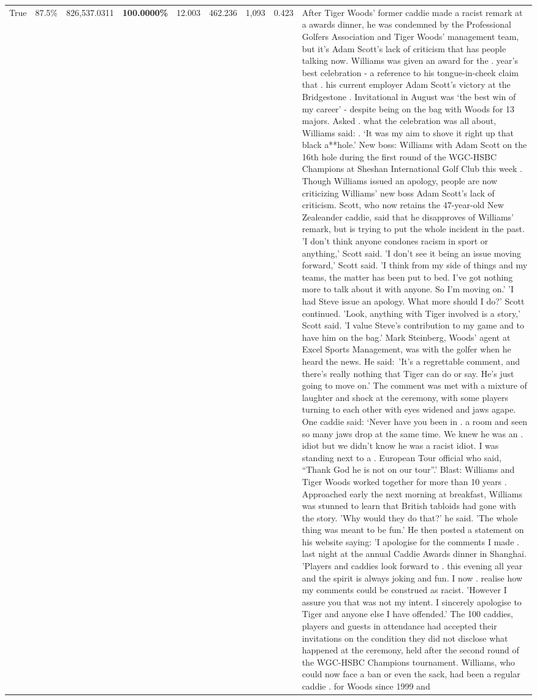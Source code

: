 \begin{table}[H]
\begin{tabular}{lllrlllll}
True & 87.5\% & 826,537.0311 & \bfseries \color{red} 100.0000\% & 12.003 & 462.236 & 1,093 & 0.423 & After Tiger Woods' former caddie made a racist remark at a awards dinner, he was condemned by the Professional Golfers Association and Tiger Woods' management team, but it's Adam Scott's lack of criticism that has people talking now. Williams was given an award for the . year’s best celebration - a reference to his tongue-in-cheek claim that . his current employer Adam Scott’s victory at the Bridgestone . Invitational in August was ‘the best win of my career’ - despite being on the bag with Woods for 13 majors. Asked . what the celebration was all about, Williams said: . ‘It was my aim to shove it right up that black a**hole.’ New boss: Williams with Adam Scott  on the 16th hole during the first round of the WGC-HSBC Champions at Sheshan International Golf Club this week . Though Williams issued an apology, people are now criticizing Williams' new boss Adam Scott's lack of criticism. Scott, who now retains the 47-year-old New Zealeander caddie, said that he disapproves of Williams' remark, but is trying to put the whole incident in the past. 'I don't think anyone condones racism in sport or anything,' Scott said. 'I don't see it being an issue moving forward,' Scott said. 'I think from my side of things and my teams, the matter has been put to bed. I've got nothing more to talk about it with anyone. So I'm moving on.' 'I had Steve issue an apology. What more should I do?' Scott continued. 'Look, anything with Tiger involved is a story,' Scott said. 'I value Steve's contribution to my game and to have him on the bag.' Mark Steinberg, Woods' agent at Excel Sports Management, was with the golfer when he heard the news. He said: 'It's a regrettable comment, and there's really nothing that Tiger can do or say. He's just going to move on.' The comment was met with a mixture of laughter and shock at the ceremony, with some players turning to each other with eyes widened and jaws agape. One caddie said: ‘Never have you been in . a room and seen so many jaws drop at the same time. We knew he was an . idiot but we didn’t know he was a racist idiot. I was standing next to a . European Tour official who said, “Thank God he is not on our tour”.’ Blast: Williams and Tiger Woods worked together for more than 10 years . Approached early the next morning at breakfast, Williams was stunned to learn that British tabloids had gone with the story. 'Why would they do that?' he said. 'The whole thing was meant to be fun.' He then posted a statement on his website saying: 'I apologise for the comments I made . last night at the annual Caddie Awards dinner in Shanghai. 'Players and caddies look forward to . this evening all year and the spirit is always joking and fun. I now . realise how my comments could be construed as racist. 'However I assure you that was not my intent. I sincerely apologise to Tiger and anyone else I have offended.' The 100 caddies, players and guests in attendance had accepted their invitations on the condition they did not disclose what happened at the ceremony, held after the second round of the WGC-HSBC Champions tournament. Williams, who could now face a ban or even the sack, had been a regular caddie . for Woods since 1999 and 
\end{tabular}
\end{table}
